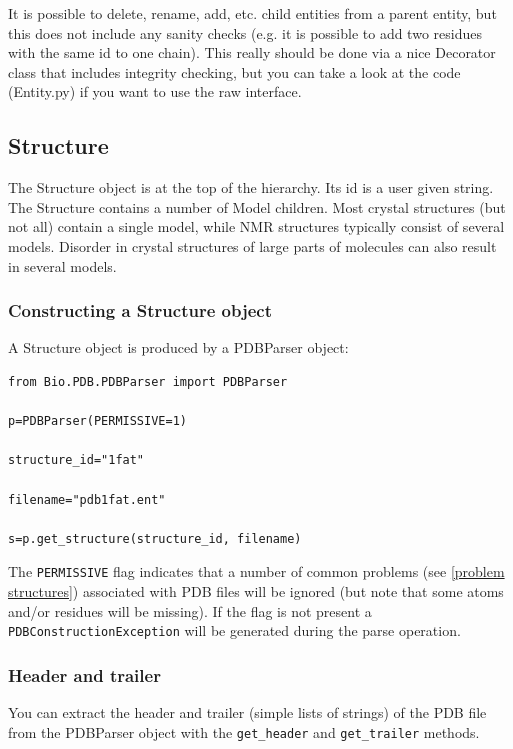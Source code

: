 \documentclass{report}
\begin{document}
It is possible to delete, rename, add, etc. child entities from a parent entity,
but this does not include any sanity checks (e.g. it is possible to add two
residues with the same id to one chain). This really should be done via a nice
Decorator class that includes integrity checking, but you can take a look at
the code (Entity.py) if you want to use the raw interface.

\subsection{Structure}

The Structure object is at the top of the hierarchy. Its id is a user given
string. The Structure contains a number of Model children. Most crystal structures
(but not all) contain a single model, while NMR structures typically consist
of several models. Disorder in crystal structures of large parts of molecules
can also result in several models.

\subsubsection{Constructing a Structure object}

A Structure object is produced by a PDBParser object:

\begin{verbatim}
from Bio.PDB.PDBParser import PDBParser

p=PDBParser(PERMISSIVE=1)

structure_id="1fat"

filename="pdb1fat.ent"

s=p.get_structure(structure_id, filename)
\end{verbatim}

The {\tt PERMISSIVE} flag indicates that a number of common problems (see \ref{problem structures})
associated with PDB files will be ignored (but note that some atoms and/or residues
will be missing). If the flag is not present a {\tt PDBConstructionException}
will be generated during the parse operation.

\subsubsection{Header and trailer}

You can extract the header and trailer (simple lists of strings) of the PDB
file from the PDBParser object with the {\tt get\_header} and {\tt get\_trailer}
methods.
\end{document}
